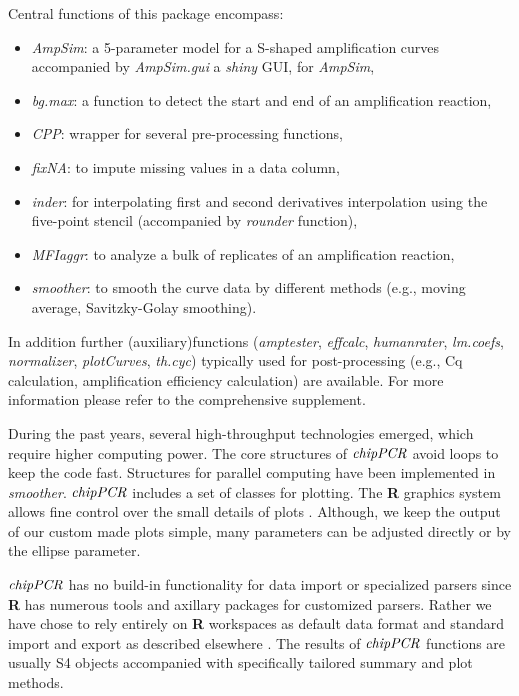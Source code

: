 \documentclass[twocolumn]{bmcart}%
\begin{document}
Central functions of this package encompass: 

\begin{itemize}
\item \textsl{AmpSim}: a 5-parameter model for a 
S-shaped amplification curves accompanied by \textsl{AmpSim.gui} a \emph{shiny} 
GUI, for \textsl{AmpSim},
\item \textsl{bg.max}: a function to detect the start and end of an 
amplification reaction,
\item \textsl{CPP}: wrapper for several pre-processing functions,
\item \textsl{fixNA}: to impute missing values in a data column,
\item \textsl{inder}: for interpolating first and second derivatives 
interpolation using the five-point stencil (accompanied by 
\textsl{rounder} function),
\item \textsl{MFIaggr}: to analyze a bulk of replicates of an amplification 
reaction, 
\item \textsl{smoother}: to smooth the curve data by different methods 
(e.g., moving average, Savitzky-Golay smoothing).
\end{itemize}

In addition further (auxiliary)functions (\textsl{amptester}, 
\textsl{effcalc}, \textsl{humanrater}, \textsl{lm.coefs}, \textsl{normalizer}, 
\textsl{plotCurves}, \textsl{th.cyc}) typically used for post-processing (e.g., 
Cq calculation, amplification efficiency calculation) are available. For more 
information please refer to the comprehensive supplement.

During the past years, several high-throughput technologies emerged, which 
require higher computing power. The core structures of $\emph{chipPCR}$ avoid 
loops to keep the code fast. Structures for parallel computing have been 
implemented in \textsl{smoother}. $\emph{chipPCR}$ includes a set of classes 
for plotting. The \textbf{R} graphics system allows fine control over the small 
details of plots \cite{Murrell_2012}. Although, we keep the output 
of our custom made plots simple, many parameters can be adjusted directly or by 
the ellipse parameter.

 $\emph{chipPCR}$ has no build-in functionality for data import or specialized 
parsers since \textbf{R} has numerous tools and axillary packages for customized 
parsers. Rather we have chose to rely entirely on \textbf{R} workspaces as 
default data format and standard import and export as described elsewhere 
\cite{RDCT2010c}. The results of $\emph{chipPCR}$ functions are usually S4 objects 
accompanied with specifically tailored summary and plot methods.
\end{document}
